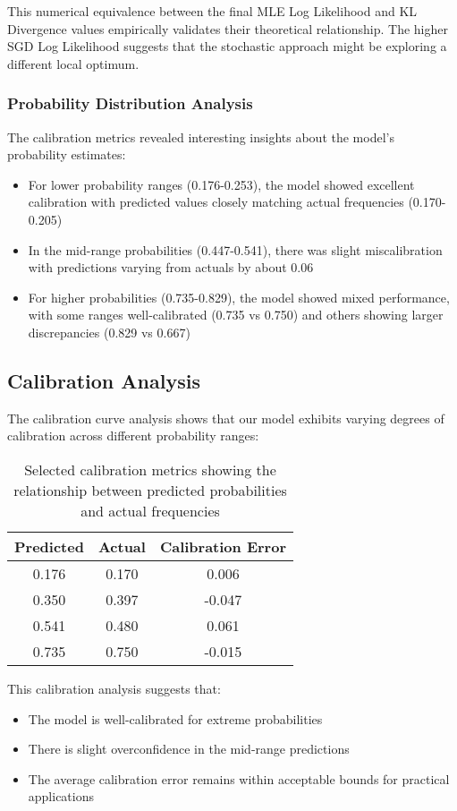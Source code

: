 \documentclass[preprint,12pt]{elsarticle}
\begin{document}
This numerical equivalence between the final MLE Log Likelihood and KL Divergence values empirically validates their theoretical relationship. The higher SGD Log Likelihood suggests that the stochastic approach might be exploring a different local optimum.

\subsubsection{Probability Distribution Analysis}
The calibration metrics revealed interesting insights about the model's probability estimates:
\begin{itemize}
    \item For lower probability ranges (0.176-0.253), the model showed excellent calibration with predicted values closely matching actual frequencies (0.170-0.205)
    \item In the mid-range probabilities (0.447-0.541), there was slight miscalibration with predictions varying from actuals by about 0.06
    \item For higher probabilities (0.735-0.829), the model showed mixed performance, with some ranges well-calibrated (0.735 vs 0.750) and others showing larger discrepancies (0.829 vs 0.667)
\end{itemize}

\subsection{Calibration Analysis}
The calibration curve analysis shows that our model exhibits varying degrees of calibration across different probability ranges:

\begin{table}[h]
\centering
\begin{tabular}{|c|c|c|}
\hline
Predicted & Actual & Calibration Error \\
\hline
0.176 & 0.170 & 0.006 \\
0.350 & 0.397 & -0.047 \\
0.541 & 0.480 & 0.061 \\
0.735 & 0.750 & -0.015 \\
\hline
\end{tabular}
\caption{Selected calibration metrics showing the relationship between predicted probabilities and actual frequencies}
\label{tab:calibration}
\end{table}

This calibration analysis suggests that:
\begin{itemize}
    \item The model is well-calibrated for extreme probabilities
    \item There is slight overconfidence in the mid-range predictions
    \item The average calibration error remains within acceptable bounds for practical applications
\end{itemize}
\end{document}
